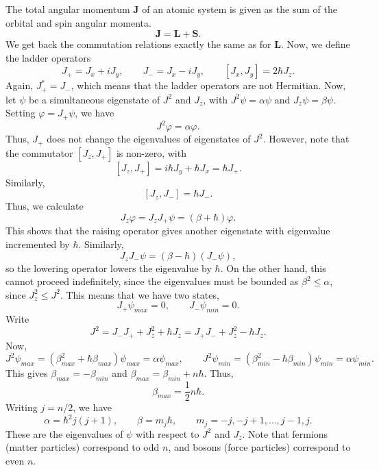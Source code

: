 \documentclass[11pt]{article}
\newcommand\ve[1]{\boldsymbol{#1}}
\def\vL{\ve{L}}
\def\vJ{\ve{J}}
\def\vS{\ve{S}}
\theoremstyle{definition}
\theoremstyle{remark}
\numberwithin{equation}{section}
\begin{document}
    The total angular momentum $\vJ$ of an atomic system is given as the sum of 
    the orbital and spin angular momenta. \[
        \vJ = \vL + \vS.
    \] We get back the commutation relations exactly the same as for $\vL$.
    Now, we define the ladder operators \[
        J_+ = J_x + iJ_y, \qquad J_- = J_x - iJ_y, \qquad 
        [J_x, J_y] = 2\hbar J_z.
    \] Again, $J_+^* = J_-$, which means that the ladder operators are not Hermitian.
    Now, let $\psi$ be a simultaneous eigenstate of $J^2$ and $J_z$, with $J^2\psi =
    \alpha\psi$ and $J_z\psi = \beta\psi$. Setting $\varphi = J_+\psi$, we have \[
        J^2\varphi = \alpha\varphi.
    \] Thus, $J_+$ does not change the eigenvalues of eigenstates of $J^2$. However,
    note that the commutator $[J_z, J_+]$ is non-zero, with \[
        [J_z, J_+] = i\hbar J_y + \hbar J_x = \hbar J_+.
    \] Similarly, \[
        [J_z, J_-] = \hbar J_-.
    \] Thus, we calculate \[
        J_z\varphi = J_z J_+\psi = (\beta + \hbar)\varphi.
    \] This shows that the raising operator gives another eigenstate with eigenvalue
    incremented by $\hbar$. Similarly, \[
        J_zJ_-\psi = (\beta - \hbar)(J_-\psi),
    \] so the lowering operator lowers the eigenvalue by $\hbar$.
    On the other hand, this cannot proceed indefinitely, since the eigenvalues must
    be bounded as $\beta^2 \leq \alpha$, since $J_z^2 \leq J^2$. This means that we
    have two states, \[
        J_+\psi_{max} = 0, \qquad J_-\psi_{min} = 0.
    \] Write \[
        J^2 = J_-J_+ + J_z^2 + \hbar J_z = J_+J_- + J_z^2 - \hbar J_z.
    \] Now, \[
        J^2\psi_{max} = (\beta_{max}^2 + \hbar\beta_{max})\psi_{max} =
        \alpha\psi_{max}, \qquad
        J^2\psi_{min} = (\beta_{min}^2 - \hbar\beta_{min})\psi_{min} =
        \alpha\psi_{min}.
    \] This gives $\beta_{max} = -\beta_{min}$ and $\beta_{max} = \beta_{min} +
    n\hbar$. Thus, \[
        \beta_{max} = \frac{1}{2}n\hbar.
    \] Writing $j = n /2$, we have \[
        \alpha = \hbar^2 j(j + 1), \qquad \beta = m_j\hbar, \qquad m_j = -j, -j + 1,
        \dots, j - 1, j.
    \] These are the eigenvalues of $\psi$ with respect to $J^2$ and $J_z$.
    Note that fermions (matter particles) correspond to odd $n$, and bosons (force
    particles) correspond to even $n$.
\end{document}
